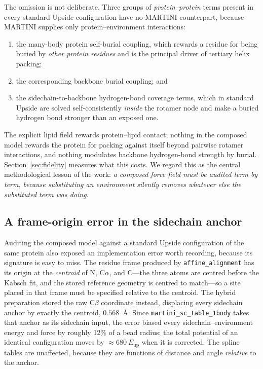 \documentclass[journal=jctcce,manuscript=article,layout=twocolumn]{achemso}
\begin{document}
The omission is not deliberate. Three groups of \emph{protein--protein} terms present
in every standard Upside configuration have no MARTINI counterpart, because MARTINI
supplies only protein--environment interactions:
\begin{enumerate}
  \item the many-body protein self-burial coupling, which rewards a residue for being
  buried by \emph{other protein residues} and is the principal driver of tertiary
  helix packing;
  \item the corresponding backbone burial coupling; and
  \item the sidechain-to-backbone hydrogen-bond coverage terms, which in standard
  Upside are solved self-consistently \emph{inside} the rotamer node and make a
  buried hydrogen bond stronger than an exposed one.
\end{enumerate}
The explicit lipid field rewards protein--lipid contact; nothing in the composed
model rewards the protein for packing against itself beyond pairwise rotamer
interactions, and nothing modulates backbone hydrogen-bond strength by burial.
Section~\ref{sec:fidelity} measures what this costs. We regard this as the central
methodological lesson of the work: \emph{a composed force field must be audited term
by term, because substituting an environment silently removes whatever else the
substituted term was doing.}

\subsection{A frame-origin error in the sidechain anchor}
\label{sec:cbfix}

Auditing the composed model against a standard Upside configuration of the same
protein also exposed an implementation error worth recording, because its signature
is easy to miss. The residue frame produced by \texttt{affine\_alignment} has its
origin at the \emph{centroid} of N, C$\alpha$, and C---the three atoms are centred
before the Kabsch fit, and the stored reference geometry is centred to match---so a
site placed in that frame must be specified relative to the centroid. The hybrid
preparation stored the raw C$\beta$ coordinate instead, displacing every sidechain
anchor by exactly the centroid, $0.568$~\AA. Since \texttt{martini\_sc\_table\_1body}
takes that anchor as its sidechain input, the error biased every
sidechain--environment energy and force by roughly 12\% of a bead radius; the total
potential of an identical configuration moves by $\approx680~E_\mathrm{up}$ when it
is corrected. The spline tables are unaffected, because they are functions of
distance and angle \emph{relative} to the anchor.
\end{document}
